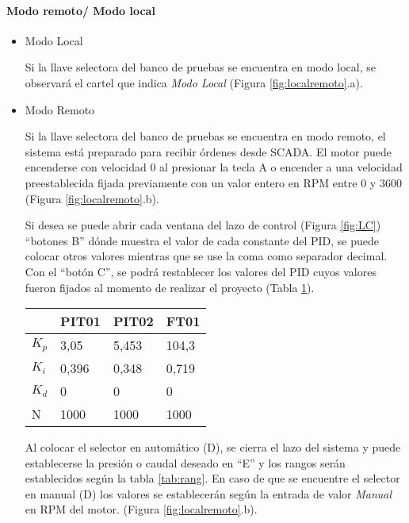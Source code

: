 \paragraph{Modo remoto/ Modo local}
\begin{itemize}
	\item Modo Local
	
	Si la llave selectora del banco de pruebas se encuentra en modo local, se observará el cartel que indica \textit{Modo Local} (Figura \ref{fig:localremoto}.a).
	
	\item Modo Remoto
	
	Si la llave selectora del banco de pruebas se encuentra en modo remoto, el sistema está preparado para recibir órdenes desde SCADA. El motor puede encenderse con velocidad 0 al presionar la tecla A o encender a una velocidad preestablecida fijada previamente con un valor entero en RPM entre 0 y 3600 (Figura \ref{fig:localremoto}.b). 
	
	Si desea se puede abrir cada ventana del lazo de control (Figura \ref{fig:LC}) ``botones B'' dónde muestra el valor de cada constante del PID, se puede colocar otros valores mientras que se use la coma como separador decimal. Con el ``botón C'', se podrá restablecer los valores del PID cuyos valores fueron fijados al momento de realizar el proyecto (Tabla \ref{tab:pid2}).
	
	\begin{table}[h]
		\centering
		\begin{tabular}{|l|l|l|l|}
			\hline
			& PIT01 & PIT02 & FT01 \\ \hline
			$K_p$ & 3,05 & 5,453 & 104,3 \\ \hline
			$K_i$ & 0,396 & 0,348 & 0,719 \\ \hline
			$K_d$ & 0 & 0 & 0 \\ \hline
			N & 1000 & 1000 & 1000 \\ \hline
		\end{tabular}
		\label{tab:pid2}
	\end{table}
	
		
	Al colocar el selector en automático (D), se cierra el lazo del sistema y puede establecerse la presión o caudal deseado en ``E'' y los rangos serán establecidos según la tabla \ref{tab:rang}. En caso de que se encuentre el selector en manual (D) los valores se establecerán según la entrada de valor \textit{Manual} en RPM del motor. (Figura \ref{fig:localremoto}.b). 
\end{itemize}

